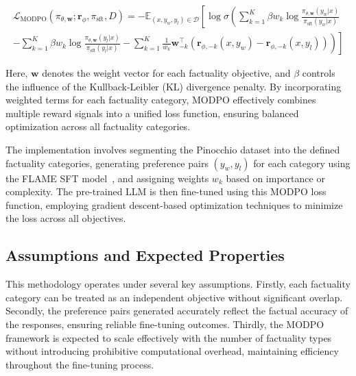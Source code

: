 \documentclass{article}
\begin{document}
\begin{multline*}
\mathcal{L}_{\text{MODPO}}(\pi_{\theta, \mathbf{w}}; \mathbf{r}_{\phi}, \pi_{\text{sft}}, D) = 
- \mathbb{E}_{(x, y_w, y_l) \in \mathcal{D}} \left[ \log \sigma \left( \sum_{k=1}^{K} \beta w_k \log \frac{\pi_{\theta, \mathbf{w}}(y_w|x)}{\pi_{\text{sft}}(y_w|x)} \right. \right. \\
\left. \left. - \sum_{k=1}^{K} \beta w_k \log \frac{\pi_{\theta, \mathbf{w}}(y_l|x)}{\pi_{\text{sft}}(y_l|x)} 
- \sum_{k=1}^{K} \frac{1}{w_k} \mathbf{w}_{-k}^\top \left( \mathbf{r}_{\phi, -k}(x, y_w) - \mathbf{r}_{\phi, -k}(x, y_l) \right) \right) \right]
\end{multline*}

Here, $\mathbf{w}$ denotes the weight vector for each factuality objective, and $\beta$ controls the influence of the Kullback-Leibler (KL) divergence penalty. By incorporating weighted terms for each factuality category, MODPO effectively combines multiple reward signals into a unified loss function, ensuring balanced optimization across all factuality categories.

The implementation involves segmenting the Pinocchio dataset into the defined factuality categories, generating preference pairs $(y_w, y_l)$ for each category using the FLAME SFT model~\cite{lin_flame_2024}, and assigning weights $w_k$ based on importance or complexity. The pre-trained LLM is then fine-tuned using this MODPO loss function, employing gradient descent-based optimization techniques to minimize the loss across all objectives.

\subsection{Assumptions and Expected Properties}

This methodology operates under several key assumptions. Firstly, each factuality category can be treated as an independent objective without significant overlap. Secondly, the preference pairs generated accurately reflect the factual accuracy of the responses, ensuring reliable fine-tuning outcomes. Thirdly, the MODPO framework is expected to scale effectively with the number of factuality types without introducing prohibitive computational overhead, maintaining efficiency throughout the fine-tuning process.
\end{document}
